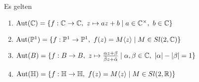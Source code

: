 \begin{thm}
  \label{thm:aut}
  Es gelten
  \begin{enumerate}
  \item $\operatorname{Aut}(\mathbb{C}) = \{ f: \mathbb{C} \rightarrow \mathbb{C}, \ z \mapsto az + b \mid a \in
    \mathbb{C}^\times, \ b \in \mathbb{C} \}$
  \item $\Aut(\P^1) = \{ f: \P^1 \ra \P^1,\ f(z) = M\langle z \rangle \mid
    M \in Sl(2, \C) \}$
  \item $\operatorname{Aut}(B) = \{ f: B \rightarrow B,\ z \mapsto \frac{\alpha z +
      \beta}{\bar \beta z + \bar \alpha} \mid \alpha, \beta \in \mathbb{C}, \
    |\alpha |- |\beta| = 1\}$
  \item $\operatorname{Aut}(\mathbb{H}) = \{f: \mathbb{H} \rightarrow \mathbb{H},\ f(z) = M\langle z \rangle 
    \mid M \in Sl(2, \mathbb{R}) \}$
  \end{enumerate}
\end{thm}

